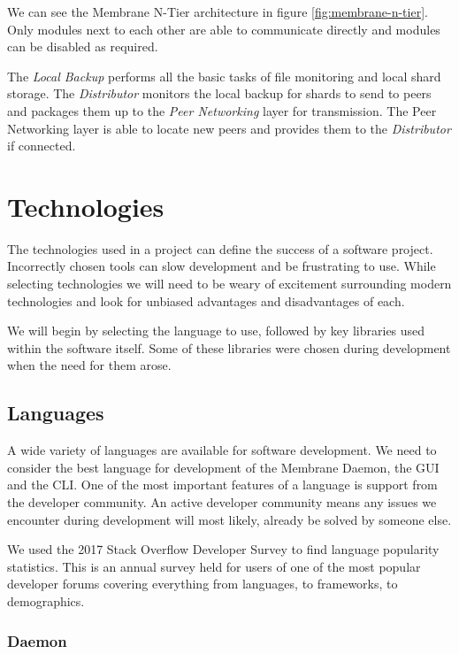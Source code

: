 \documentclass[11pt, a4paper, twoside]{report}
\begin{document}
We can see the Membrane N-Tier architecture in figure \ref{fig:membrane-n-tier}. Only modules next to each other are able to communicate directly and modules can be disabled as required.

The \emph{Local Backup} performs all the basic tasks of file monitoring and local shard storage. The \emph{Distributor} monitors the local backup for shards to send to peers and packages them up to the \emph{Peer Networking} layer for transmission. The Peer Networking layer is able to locate new peers and provides them to the \emph{Distributor} if connected.

\section{Technologies}

The technologies used in a project can define the success of a software project. Incorrectly chosen tools can slow development and be frustrating to use. While selecting technologies we will need to be weary of excitement surrounding modern technologies and look for unbiased advantages and disadvantages of each.

We will begin by selecting the language to use, followed by key libraries used within the software itself. Some of these libraries were chosen during development when the need for them arose.

\subsection{Languages}

A wide variety of languages are available for software development. We need to consider the best language for development of the Membrane Daemon, the GUI and the CLI. One of the most important features of a language is support from the developer community. An active developer community means any issues we encounter during development will most likely, already be solved by someone else.

We used the 2017 Stack Overflow Developer Survey \citep{stackoverflow2017survey} to find language popularity statistics. This is an annual survey held for users of one of the most popular developer forums covering everything from languages, to frameworks, to demographics.

\subsubsection{Daemon}
\end{document}
